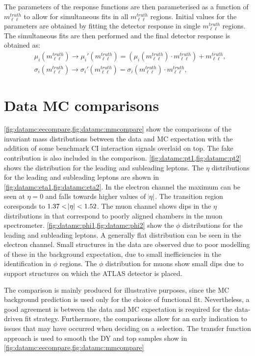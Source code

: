 The parameters of the response functions are then parameterised as a function of $m_{\ell\ell}^{truth}$ to allow for simultaneous fits in all $m_{\ell\ell}^{truth}$ regions. Initial values for the parameters are obtained by fitting the detector response in single $m_{\ell\ell}^{truth}$ regions. The simultaneous fits are then performed and the final detector response is obtained as:
\begin{equation}\label{eq:TF_responseTransformation}
    \begin{aligned}
        & \mu_i(m_{\ell\ell}^{truth}) \to \mu_i'(m_{\ell\ell}^{truth}) = \left(\mu_i(m_{\ell\ell}^{truth}) \cdot m_{\ell\ell}^{truth}\right) + m_{\ell\ell}^{truth}, \\
        & \sigma_i(m_{\ell\ell}^{truth}) \to \sigma_i'(m_{\ell\ell}^{truth}) = \sigma_i(m_{\ell\ell}^{truth}) \cdot m_{\ell\ell}^{truth},
    \end{aligned}
\end{equation}

\section{Data MC comparisons}\label{sec:datamc:compare}
\cref{fig:datamc:eecompare,fig:datamc:mmcompare} show the comparisons of the invariant mass distributions between the data and MC expectation with the addition of some benchmark CI interaction signals overlaid on top. The fake contribution is also included in the comparison. 
\cref{fig:datamc:pt1,fig:datamc:pt2} shows the \pt distribution for the leading and subleading leptons. The $\eta$ distributions for the leading and subleading leptons are shown in \cref{fig:datamc:eta1,fig:datamc:eta2}. In the electron channel the maximum can be seen at $\eta = 0$ and falls towards higher values of $\abs{\eta}$. The transition region coresponds to $1.37 < \abs{\eta} < 1.52$. The muon channel shows dips in the $\eta$ distributions in that correspond to poorly aligned chambers in the muon spectrometer. \cref{fig:datamc:phi1,fig:datamc:phi2} show the $\phi$ distributions for the leading and subleading leptons. A generally flat distribution can be seen in the electron channel. Small structures in the data are observed due to poor modelling of these in the background expectation, due to small inefficiencies in the identification in $\phi$ regions. The $\phi$ distribution for muons show small dips due to support structures on which the ATLAS detector is placed. 

The comparison is mainly produced for illustrative purposes, since the MC background prediction is used only for the choice of functional fit. Nevertheless, a good agreement is between the data and MC expectation is required for the data-driven fit strategy. Furthermore, the comparisons allow for an early indication to issues that may have occurred when deciding on a selection. The transfer function approach is used to smooth the DY and top samples show in \cref{fig:datamc:eecompare,fig:datamc:mmcompare}

